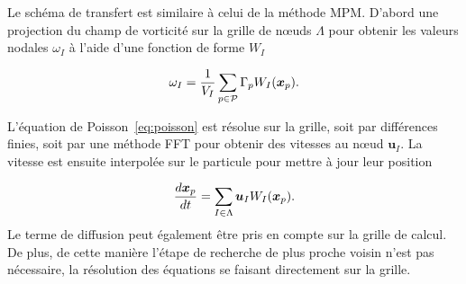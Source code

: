 Le schéma de transfert est similaire à celui de la méthode MPM. D'abord une projection du champ de vorticité sur la grille de nœuds $\Lambda$ pour obtenir les valeurs nodales $\omega_I$ à l'aide d'une fonction de forme $W_I$

\begin{equation*}
    \omega_I = \frac{1}{V_I}\sum_{p \in \mathcal P} \Gamma_p W_I(\bm{x}_p).
\end{equation*}

L'équation de Poisson~\ref{eq:poisson} est résolue sur la grille, soit par différences finies, soit par une méthode FFT pour obtenir des vitesses au nœud $\bm u_I$. La vitesse est ensuite interpolée sur le particule pour mettre à jour leur position

\begin{equation*}
    \frac{d \bm x_p}{d t} = \sum_{I \in \Lambda} \bm u_I W_I(\bm{x}_p).
\end{equation*}
Le terme de diffusion peut également être pris en compte sur la grille de calcul. De plus, de cette manière l'étape de recherche de plus proche voisin n'est pas nécessaire, la résolution des équations se faisant directement sur la grille.




